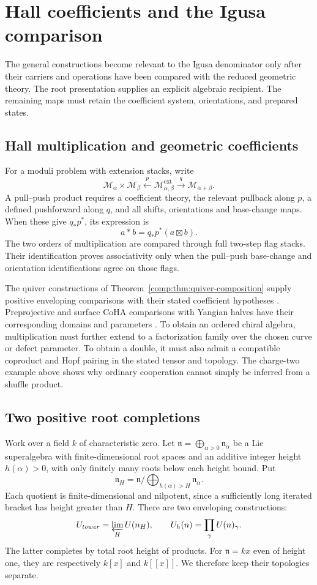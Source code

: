 \chapter{Hall coefficients and the Igusa comparison}

The general constructions become relevant to the Igusa denominator only after
their carriers and operations have been compared with the reduced geometric theory.
The root presentation supplies an explicit algebraic recipient. The remaining
maps must retain the coefficient system, orientations, and prepared states.

\section{Hall multiplication and geometric coefficients}
For a moduli problem with extension stacks, write
\[
 \mathcal M_\alpha\times\mathcal M_\beta
 \xleftarrow{p}\mathcal M_{\alpha,\beta}^{\mathrm{ext}}
 \xrightarrow{q}\mathcal M_{\alpha+\beta}.
\]
A pull--push product requires a coefficient theory, the relevant pullback
along $p$, a defined pushforward along $q$, and all shifts, orientations and
base-change maps. When these give $q_*p^*$, its expression is
\[
 a*b=q_*p^*(a\boxtimes b).
\]
The two orders of multiplication are compared through full two-step flag stacks.
Their identification proves associativity only when the pull--push base-change
and orientation identifications agree on those flags.

The quiver constructions of Theorem~\ref{comp:thm:quiver-composition} supply
positive enveloping comparisons with their stated coefficient hypotheses
\cite{DHS}. Preprojective and surface CoHA comparisons with Yangian halves
have their corresponding domains and parameters \cite{SVYangians,DPPSSV}.
To obtain an ordered chiral algebra, multiplication must further extend to a
factorization family over the chosen curve or defect parameter.
To obtain a double, it must also admit a compatible coproduct and Hopf pairing
in the stated tensor and topology. The charge-two example above shows why
ordinary cooperation cannot simply be inferred from a shuffle product.

\section{Two positive root completions}
Work over a field $k$ of characteristic zero. Let
$\mathfrak n=\bigoplus_{\alpha>0}\mathfrak n_\alpha$ be a Lie superalgebra
with finite-dimensional root spaces and an additive integer height
$h(\alpha)>0$, with only finitely many roots below each height bound.
Put
\[
 \mathfrak n_H=\mathfrak n/\!\bigoplus_{h(\alpha)>H}\mathfrak n_\alpha.
\]
Each quotient is finite-dimensional and nilpotent, since a sufficiently long
iterated bracket has height greater than $H$.
There are two enveloping constructions:
\[
 U_{\mathrm{tower}}=\varprojlim_HU(\mathfrak n_H),
 \qquad
 \widehat U_h(\mathfrak n)=\prod_\gamma U(\mathfrak n)_\gamma.
\]
The latter completes by total root height of products.
For $\mathfrak n=kx$ even of height one, they are respectively $k[x]$ and $k[[x]]$.
We therefore keep their topologies separate.


